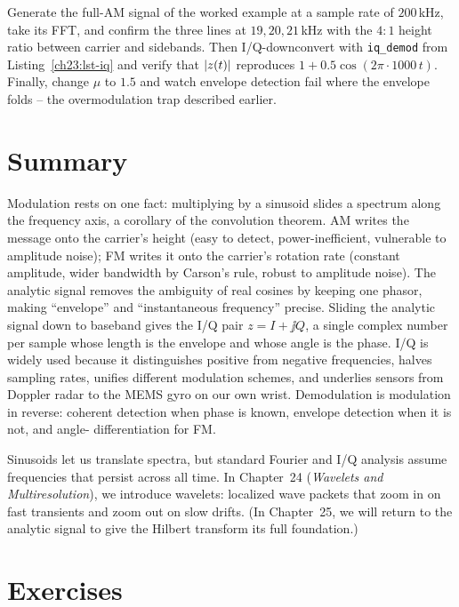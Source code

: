 \begin{labbox}
Generate the full-AM signal of the worked example at a sample rate of $200\,$kHz, take its
FFT, and confirm the three lines at $19,20,21\,$kHz with the $4{:}1$ height ratio between
carrier and sidebands. Then I/Q-downconvert with \texttt{iq\_demod} from
Listing~\ref{ch23:lst-iq} and verify that $\lvert z(t)\rvert$ reproduces $1+0.5\cos(2\pi\cdot
1000\,t)$. Finally, change $\mu$ to $1.5$ and watch envelope detection fail where the
envelope folds -- the overmodulation trap described earlier.
\end{labbox}

\section{Summary}
\label{ch23:summary}

Modulation rests on one fact: multiplying by a sinusoid slides a spectrum along the
frequency axis, a corollary of the convolution theorem. AM writes the message onto the
carrier's height (easy to detect, power-inefficient, vulnerable to amplitude noise); FM
writes it onto the carrier's rotation rate (constant amplitude, wider bandwidth by
Carson's rule, robust to amplitude noise). The analytic signal removes the ambiguity of
real cosines by keeping one phasor, making ``envelope'' and ``instantaneous frequency''
precise. Sliding the analytic signal down to baseband gives the I/Q pair $z=I+\jj Q$, a
single complex number per sample whose length is the envelope and whose angle is the
phase. I/Q is widely used because it distinguishes positive from negative frequencies, halves
sampling rates, unifies different modulation schemes, and underlies sensors from Doppler radar
to the MEMS gyro on our own wrist. Demodulation is modulation in reverse: coherent
detection when phase is known, envelope detection when it is not, and angle-
differentiation for FM.

Sinusoids let us translate spectra, but standard Fourier and I/Q analysis assume
frequencies that persist across all time. In Chapter~24 (\emph{Wavelets and Multiresolution}),
we introduce wavelets: localized wave packets that zoom in on fast transients and zoom out on
slow drifts. (In Chapter~25, we will return to the analytic signal to give the Hilbert transform
its full foundation.)

\section{Exercises}
\label{ch23:exercises}

